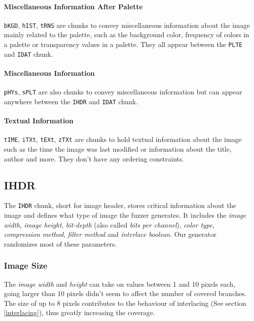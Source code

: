 \documentclass[runningheads]{llncs}
\begin{document}
\paragraph{Miscellaneous Information After Palette}
\texttt{bKGD}, \texttt{hIST}, \texttt{tRNS} are chunks to convey miscellaneous information about the image mainly related to the palette, such as the background color, frequency of colors in a palette or transparency values in a palette. They all appear between the \texttt{PLTE} and \texttt{IDAT} chunk.

\paragraph{Miscellaneous Information}
\texttt{pHYs}, \texttt{sPLT} are also chunks to convey miscellaneous information but can appear anywhere between the \texttt{IHDR} and \texttt{IDAT} chunk.

\paragraph{Textual Information}
\texttt{tIME}, \texttt{iTXt}, \texttt{tEXt}, \texttt{zTXt} are chunks to hold textual information about the image such as the time the image was last modified or information about the title, author and more. They don't have any ordering constraints.

\subsection{IHDR}
The \texttt{IHDR} chunk, short for image header, stores critical information about the image and defines what type of image the fuzzer generates.
It includes the \textit{image width}, \textit{image height}, \textit{bit-depth} (also called \textit{bits per channel}), \textit{color type}, \textit{compression method}, \textit{filter method} and \textit{interlace boolean}.
Our generator randomizes most of these parameters.

\subsubsection{Image Size}
The \textit{image width} and \textit{height} can take on values between 1 and 10 pixels each, going larger than 10 pixels didn't seem to affect the number of covered branches. 
The size of up to 8 pixels contributes to the behaviour of interlacing (See section \ref{interlacing}), thus greatly increasing the coverage.
\end{document}
